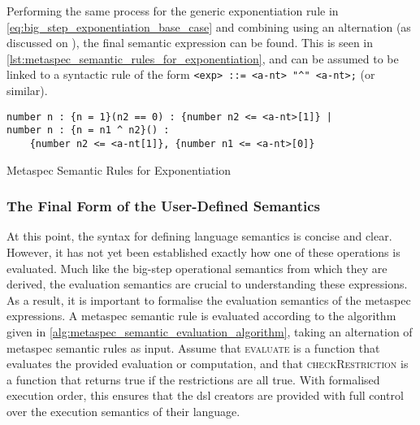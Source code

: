Performing the same process for the generic exponentiation rule in \autoref{eq:big_step_exponentiation_base_case} and combining using an alternation (as discussed on ), the final semantic expression can be found.
This is seen in \autoref{lst:metaspec_semantic_rules_for_exponentiation}, and can be assumed to be linked to a syntactic rule of the form \texttt{<exp> ::= <a-nt> "^" <a-nt>;} (or similar).

\begin{listing}[!htb]
\begin{verbatim}
number n : {n = 1}(n2 == 0) : {number n2 <= <a-nt>[1]} |
number n : {n = n1 ^ n2}() : 
    {number n2 <= <a-nt[1]}, {number n1 <= <a-nt>[0]}
\end{verbatim}
\caption{Metaspec Semantic Rules for Exponentiation}
\label{lst:metaspec_semantic_rules_for_exponentiation}
\end{listing}



\subsubsection{The Final Form of the User-Defined Semantics} %
\label{ssub:the_final_form_of_the_user_defined_semantics}
At this point, the syntax for defining language semantics is concise and clear.
However, it has not yet been established exactly how one of these operations is evaluated.
Much like the big-step operational semantics from which they are derived, the evaluation semantics are crucial to understanding these expressions. \\

As a result, it is important to formalise the evaluation semantics of the metaspec expressions. 
A metaspec semantic rule is evaluated according to the algorithm given in \autoref{alg:metaspec_semantic_evaluation_algorithm}, taking an alternation of metaspec semantic rules as input.
Assume that \textsc{evaluate} is a function that evaluates the provided evaluation or computation, and that \textsc{checkRestriction} is a function that returns true if the restrictions are all true.
With formalised execution order, this ensures that the \gls{dsl} creators are provided with full control over the execution semantics of their language.

